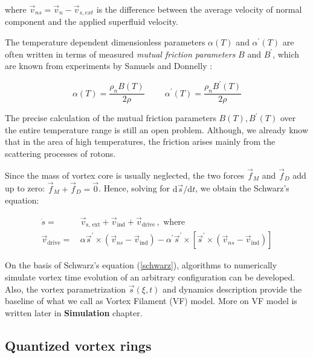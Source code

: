 where $\vec{v}_{ns} = \vec{v}_{n} - \vec{v}_{s,ext}$ is the difference between the average velocity of normal component and the applied superfluid velocity.

The temperature dependent dimensionless parameters $\alpha(T)$ and $\alpha^{\prime}(T)$ are often written in terms of measured \textit{mutual friction parameters} $B$ and $B^{\prime}$, which are known from experiments by Samuels and Donnelly \cite{donnelly}:

\begin{equation}
\alpha(T) = \frac{\rho_n B(T)}{2\rho}
\hspace{1cm}
\alpha^{\prime}(T) = \frac{\rho_n B^{\prime}(T)}{2\rho}
\end{equation}

The precise calculation of the mutual friction parameters $B(T), B^{\prime}(T)$ over the entire temperature range is still an open problem. Although, we already know that in the area of high temperatures, the friction arises mainly from the scattering processes of rotons.

\newpage

Since the mass of vortex core is usually neglected, the two forces $\vec{f}_M$ and $\vec{f}_D$ add up to zero: $\vec{f}_M + \vec{f}_D = \vec{0}$. Hence, solving for $\text{d}\vec{s} / \text{d} t$, we obtain \cite{schwarz} the Schwarz's equation:

\begin{align}
\dot{s} =& \,\vec{v}_{\text{s, ext}} + \vec{v}_{\text{ind}} + \vec{v}_{\text{drive}}
\,,\,\, \text{where}
\label{schwarz}
\\
\vec{v}_{\text{drive}} =& \,\alpha\vec{s}^{\prime} \times (\vec{v}_{ns} - \vec{v}_{\text{ind}})
- \alpha^{\prime}\vec{s}^{\prime} \times [\vec{s}^{\prime} \times (\vec{v}_{ns} - \vec{v}_{\text{ind}})]
\label{drive}
\end{align}

On the basis of Schwarz's equation (\ref{schwarz}), algorithms to numerically simulate vortex time evolution of an arbitrary configuration can be developed. Also, the vortex parametrization $\vec{s}(\xi, t)$ and dynamics description provide the baseline of what we call as Vortex Filament (VF) model. More on VF model is written later in \textbf{Simulation} chapter.



\subsection*{Quantized vortex rings}

